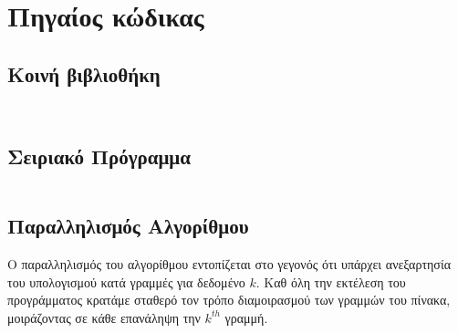 \documentclass[a4paper,10pt]{article} \usepackage{anysize}
\begin{document}

\renewcommand{\theenumi}{\roman{enumi}}


\def\thesubsection {Ζητούμενο \arabic{subsection}}
\section*{Πηγαίος κώδικας}


\subsection*{Κοινή βιβλιοθήκη}

\inputminted[linenos,fontsize=\scriptsize,frame=leftline]{c}{files/src-lib-common.h}

\inputminted[linenos,fontsize=\scriptsize,frame=leftline]{c}{files/src-lib-common.c}


\setcounter{section}{1}

\subsection{Σειριακό Πρόγραμμα}

\inputminted[linenos,fontsize=\scriptsize,frame=leftline]{c}{files/src-serial-main.c}



\subsection{Παραλληλισμός Αλγορίθμου}

Ο παραλληλισμός του αλγορίθμου εντοπίζεται στο γεγονός ότι υπάρχει ανεξαρτησία
του υπολογισμού κατά γραμμές για δεδομένο $k$. Καθ όλη την εκτέλεση του
προγράμματος κρατάμε σταθερό τον τρόπο διαμοιρασμού των γραμμών του πίνακα,
μοιράζοντας σε κάθε επανάληψη την $k^{th}$ γραμμή. 
\end{document}

